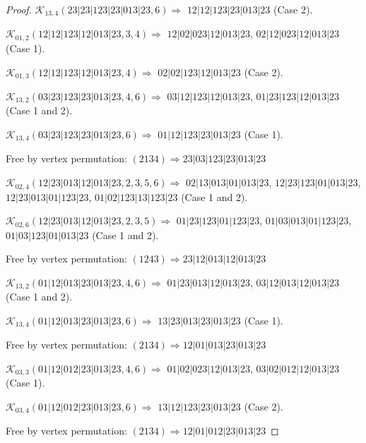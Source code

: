 \documentclass[12pt]{article}
\theoremstyle{plain}
\theoremstyle{definition}
\theoremstyle{remark}
\newcommand{\fancy}[1]{\mathcal{#1}}
\def\K{\fancy{K}}
\begin{document}
\begin{proof}
	$\K_{13,4}(23|23|123|23|013|23,6)\Rightarrow $ $12|12|123|23|013|23$ (Case 2).
	
	
	\bigskip
	
	$\K_{01,2}(12|12|123|12|013|23,3, 4)\Rightarrow $ $12|02|023|12|013|23$, $02|12|023|12|013|23$ (Case 1).
	
	$\K_{01,3}(12|12|123|12|013|23,4)\Rightarrow $ $02|02|123|12|013|23$ (Case 2).
	
	
	\bigskip
	
	$\K_{13,2}(03|23|123|23|013|23,4, 6)\Rightarrow $ $03|12|123|12|013|23$, $01|23|123|12|013|23$ (Case 1 and 2).
	
	$\K_{13,4}(03|23|123|23|013|23,6)\Rightarrow $ $01|12|123|23|013|23$ (Case 1).
	
	
	
	Free by vertex permutation: $(2 1 3 4)\Rightarrow 23|03|123|23|013|23$
	
	
	
	\bigskip
	
	$\K_{02,4}(12|23|013|12|013|23,2, 3, 5, 6)\Rightarrow $ $02|13|013|01|013|23$, $12|23|123|01|013|23$, $12|23|013|01|123|23$, $01|02|123|13|123|23$ (Case 1 and 2).
	
	$\K_{02,6}(12|23|013|12|013|23,2, 3, 5)\Rightarrow $ $01|23|123|01|123|23$, $01|03|013|01|123|23$, $01|03|123|01|013|23$ (Case 1 and 2).
	
	
	
	Free by vertex permutation: $(1 2 4 3)\Rightarrow 23|12|013|12|013|23$
	
	
	
	\bigskip
	
	$\K_{13,2}(01|12|013|23|013|23,4, 6)\Rightarrow $ $01|23|013|12|013|23$, $03|12|013|12|013|23$ (Case 1 and 2).
	
	$\K_{13,4}(01|12|013|23|013|23,6)\Rightarrow $ $13|23|013|23|013|23$ (Case 1).
	
	
	
	Free by vertex permutation: $(2 1 3 4)\Rightarrow 12|01|013|23|013|23$
	
	
	
	\bigskip
	
	$\K_{03,3}(01|12|012|23|013|23,4, 6)\Rightarrow $ $01|02|023|12|013|23$, $03|02|012|12|013|23$ (Case 1).
	
	$\K_{03,4}(01|12|012|23|013|23,6)\Rightarrow $ $13|12|123|23|013|23$ (Case 2).
	
	
	
	Free by vertex permutation: $(2 1 3 4)\Rightarrow 12|01|012|23|013|23$
	

\end{proof}
\end{document}
